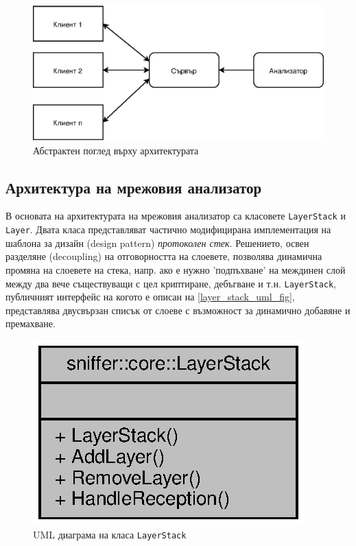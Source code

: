 \documentclass[12pt,a4paper,oneside]{book}
\begin{document}
\begin{figure}[h!]
  \centering
  \includegraphics[scale=.7]{figures/client_server_abstract.eps}
  \caption{Абстрактен поглед върху архитектурата}
  \label{client_server_abstract_fig}
\end{figure}

\subsection{Архитектура на мрежовия анализатор}

В основата на архитектурата на мрежовия анализатор са класовете
\texttt{LayerStack} и \texttt{Layer}. Двата класа представляват частично
модифицирана имплементация на шаблона за дизайн (design pattern)
\textit{протоколен стек}. Решението, освен разделяне (decoupling) на
отговорността на слоевете, позволява динамична промяна на слоевете на стека,
напр. ако е нужно 'подпъхване' на междинен слой между два вече съществуващи с
цел криптиране, дебъгване и т.н. \texttt{LayerStack}, публичният интерфейс на
когото е описан на \autoref{layer_stack_uml_fig}, представлява двусвързан списък
от слоеве с възможност за динамично добавяне и премахване.

\begin{figure}[h!]
  \centering
  \includegraphics[scale=.9]{figures/layer_stack_uml.eps}
  \caption{UML диаграма на класа \texttt{LayerStack}}
  \label{layer_stack_uml_fig}
\end{figure}
\end{document}
